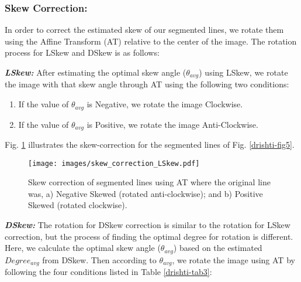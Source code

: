 \documentclass[runningheads]{llncs}
\begin{document}
\subsubsection{Skew Correction:}
In order to correct the estimated skew of our segmented lines, we rotate them using the Affine Transform (AT) relative to the center of the image. The rotation process for LSkew and DSkew is as follows:

\noindent\textbf{\textit{LSkew:}} After estimating the optimal skew angle ($\theta_{avg}$) using LSkew, we rotate the image with that skew angle through AT using the following two conditions:
\begin{enumerate}
  \item If the value of $\theta_{avg}$ is Negative, we rotate the image Clockwise.
  \item If the value of $\theta_{avg}$ is Positive, we rotate the image Anti-Clockwise.
\end{enumerate}

\noindent Fig. \ref{drishti-fig8} illustrates the skew-correction for the segmented lines of Fig. \ref{drishti-fig5}.

\begin{figure}
\vspace{-4mm}
\centering
\texttt{[image: images/skew\_correction\_LSkew.pdf]}
\vspace{-8mm}
\caption{Skew correction of segmented lines using AT where the original line was, a) Negative Skewed (rotated anti-clockwise); and b) Positive Skewed (rotated clockwise).} 
\label{drishti-fig8}
\vspace{-4mm}
\end{figure}

\noindent\textbf{\textit{DSkew:}} The rotation for DSkew correction is similar to the rotation for LSkew correction, but the process of finding the optimal degree for rotation is different. Here, we calculate the optimal skew angle ($\theta_{avg}$) based on the estimated $Degree_{avg}$ from DSkew. Then according to $\theta_{avg}$, we rotate the image using AT by following the four conditions listed in Table \ref{drishti-tab3}:
\end{document}
